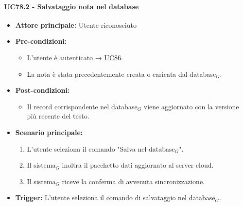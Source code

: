 \documentclass[a4paper, 10pt]{article}
\newcommand{\uclink}[2]{\hyperlink{#1}{\textcolor{black}{\underline{#2}}}}
\begin{document}
\paragraph{UC78.2 - Salvataggio nota nel database}
\hypertarget{uc:78.2}{}
\begin{itemize}
    \item \textbf{Attore principale:} Utente riconosciuto
    \item \textbf{Pre-condizioni:} 
        \begin{itemize}
            \item L'utente è autenticato → \uclink{uc:86}{UC86}.
            \item La nota è stata precedentemente creata o caricata dal database$_G$.
        \end{itemize}
    \item \textbf{Post-condizioni:} 
        \begin{itemize}
            \item Il record corrispondente nel database$_G$ viene aggiornato con la versione più recente del testo.
        \end{itemize}
    \item \textbf{Scenario principale:}
        \begin{enumerate}
            \item L'utente seleziona il comando "Salva nel database$_G$".
            \item Il sistema$_G$ inoltra il pacchetto dati aggiornato al server cloud.
            \item Il sistema$_G$ riceve la conferma di avvenuta sincronizzazione.
        \end{enumerate}
    \item \textbf{Trigger:} L'utente seleziona il comando di salvataggio nel database$_G$.
\end{itemize}
\end{document}

